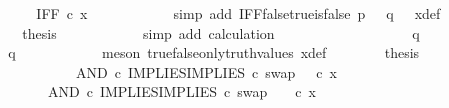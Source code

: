 \begin{isabellebody}
\ \ \ \ \ \ \ \ \isamarkupfalse%
\ \isamarkupfalse%
\ {\isachardoublequoteopen}{\isachardot}{\kern0pt}{\isachardot}{\kern0pt}{\isachardot}{\kern0pt}\ {\isacharequal}{\kern0pt}\ IFF\ {\isasymcirc}\isactrlsub c\ x{\isachardoublequoteclose}\isanewline
\ \ \ \ \ \ \ \ \ \ \isamarkupfalse%
\ {\isacharparenleft}{\kern0pt}simp\ add{\isacharcolon}{\kern0pt}\ IFF{\isacharunderscore}{\kern0pt}false{\isacharunderscore}{\kern0pt}true{\isacharunderscore}{\kern0pt}is{\isacharunderscore}{\kern0pt}false\ {\isacartoucheopen}p\ {\isacharequal}{\kern0pt}\ {\isasymf}{\isacartoucheclose}\ {\isacartoucheopen}q\ {\isacharequal}{\kern0pt}\ {\isasymt}{\isacartoucheclose}\ x{\isacharunderscore}{\kern0pt}def{\isacharparenright}{\kern0pt}\isanewline
\ \ \ \ \ \ \ \ \isamarkupfalse%
\ \isamarkupfalse%
\ {\isacharquery}{\kern0pt}thesis\isanewline
\ \ \ \ \ \ \ \ \ \ \isamarkupfalse%
\ {\isacharparenleft}{\kern0pt}simp\ add{\isacharcolon}{\kern0pt}\ calculation{\isacharparenright}{\kern0pt}\isanewline
\ \ \ \ \ \ \isamarkupfalse%
\isanewline
\ \ \ \ \isamarkupfalse%
\isanewline
\ \ \ \ \ \ \isamarkupfalse%
\ {\isachardoublequoteopen}q\ {\isasymnoteq}\ {\isasymt}{\isachardoublequoteclose}\isanewline
\ \ \ \ \ \ \isamarkupfalse%
\ \isamarkupfalse%
\ {\isachardoublequoteopen}q\ {\isacharequal}{\kern0pt}\ {\isasymf}{\isachardoublequoteclose}\isanewline
\ \ \ \ \ \ \ \ \isamarkupfalse%
\ {\isacharparenleft}{\kern0pt}meson\ true{\isacharunderscore}{\kern0pt}false{\isacharunderscore}{\kern0pt}only{\isacharunderscore}{\kern0pt}truth{\isacharunderscore}{\kern0pt}values\ x{\isacharunderscore}{\kern0pt}def{\isacharparenright}{\kern0pt}\isanewline
\ \ \ \ \ \ \isamarkupfalse%
\ {\isacharquery}{\kern0pt}thesis\isanewline
\ \ \ \ \ \ \isamarkupfalse%
\ {\isacharminus}{\kern0pt}\ \isanewline
\ \ \ \ \ \ \ \ \isamarkupfalse%
\ {\isachardoublequoteopen}{\isacharparenleft}{\kern0pt}AND\ {\isasymcirc}\isactrlsub c\ {\isasymlangle}IMPLIES{\isacharcomma}{\kern0pt}IMPLIES\ {\isasymcirc}\isactrlsub c\ swap\ {\isasymOmega}\ {\isasymOmega}{\isasymrangle}{\isacharparenright}{\kern0pt}\ {\isasymcirc}\isactrlsub c\ x\ {\isacharequal}{\kern0pt}\ \ \ \ \isanewline
\ \ \ \ \ \ \ \ \ \ \ \ \ \ \ AND\ {\isasymcirc}\isactrlsub c\ {\isasymlangle}IMPLIES{\isacharcomma}{\kern0pt}IMPLIES\ {\isasymcirc}\isactrlsub c\ swap\ {\isasymOmega}\ {\isasymOmega}{\isasymrangle}\ \ {\isasymcirc}\isactrlsub c\ x{\isachardoublequoteclose}\isanewline

\end{isabellebody}
